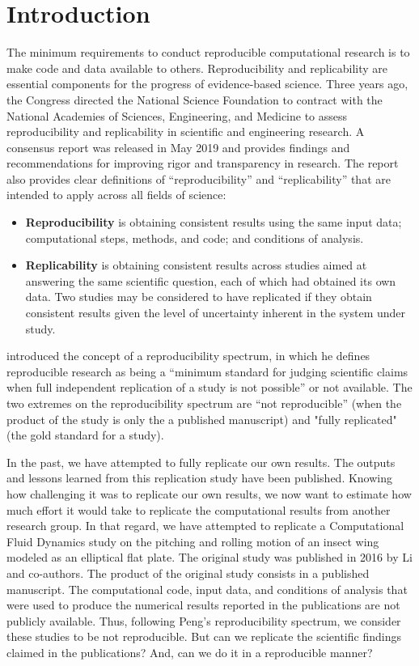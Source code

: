 \section{Introduction}

The minimum requirements to conduct reproducible computational research is to make code and data available to others.
Reproducibility and replicability are essential components for the progress of evidence-based science.
Three years ago, the Congress directed the National Science Foundation to contract with the National Academies of Sciences, Engineering, and Medicine to assess reproducibility and replicability in scientific and engineering research.
A consensus report\supercite{nasem_2019} was released in May 2019 and provides findings and recommendations for improving rigor and transparency in research.
The report also provides clear definitions of ``reproducibility'' and ``replicability'' that are intended to apply across all fields of science:

\begin{itemize}
  \item[] \textbf{Reproducibility} is obtaining consistent results using the same input data; computational steps, methods, and code; and conditions of analysis.
  \item[] \textbf{Replicability} is obtaining consistent results across studies aimed at answering the same scientific question, each of which had obtained its own data. Two studies may be considered to have replicated if they obtain consistent results given the level of uncertainty inherent in the system under study.
\end{itemize}

\citet{peng_2011} introduced the concept of a reproducibility spectrum, in which he defines reproducible research as being a ``minimum standard for judging scientific claims when full independent replication of a study is not possible'' or not available.
The two extremes on the reproducibility spectrum are ``not reproducible'' (when the product of the study is only the a published manuscript) and "fully replicated" (the gold standard for a study).

In the past, we have attempted to fully replicate our own results.\supercite{krishnan_et_al_2014}
The outputs and lessons learned from this replication study have been published.\supercite{mesnard_barba_2017}
Knowing how challenging it was to replicate our own results, we now want to estimate how much effort it would take to replicate the computational results from another research group.
In that regard, we have attempted to replicate a Computational Fluid Dynamics study on the pitching and rolling motion of an insect wing modeled as an elliptical flat plate.
The original study was published in 2016 by Li and co-authors.\supercite{li_dong_2016}
The product of the original study consists in a published manuscript.
The computational code, input data, and conditions of analysis that were used to produce the numerical results reported in the publications are not publicly available.
Thus, following Peng's reproducibility spectrum, we consider these studies to be not reproducible.
But can we replicate the scientific findings claimed in the publications?
And, can we do it in a reproducible manner?


